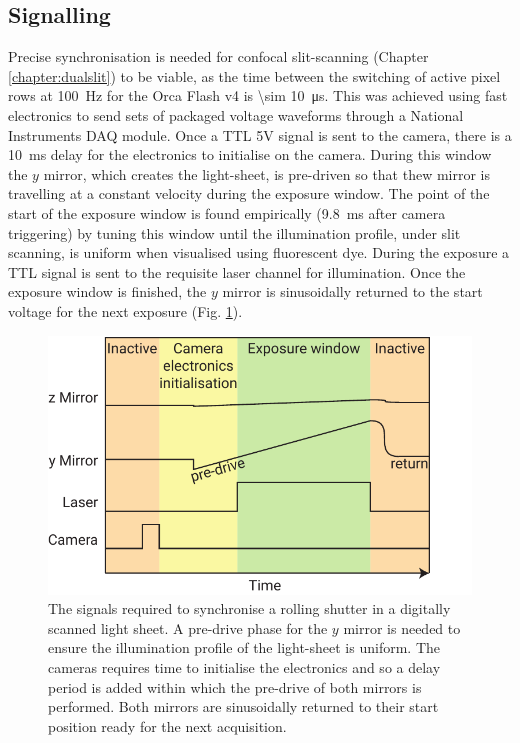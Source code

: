 

\subsection{Signalling} %

Precise synchronisation is needed for confocal slit-scanning (Chapter \ref{chapter:dualslit}) to be viable, as the time between the switching of active pixel rows at \SI{100}{\hertz} for the Orca Flash v4 is \SI{\sim 10}{\micro\second}. %
This was achieved using fast electronics to send sets of packaged voltage waveforms through a National Instruments DAQ module.
Once a TTL 5V signal is sent to the camera, there is a \SI{10}{\milli\second} delay for the electronics to initialise on the camera.
During this window the $y$ mirror, which creates the light-sheet, is pre-driven so that thew mirror is travelling at a constant velocity during the exposure window.
The point of the start of the exposure window is found empirically (\SI{9.8}{\milli\second} after camera triggering) by tuning this window until the illumination profile, under slit scanning, is uniform when visualised using fluorescent dye.
During the exposure a TTL signal is sent to the requisite laser channel for illumination.
Once the exposure window is finished, the $y$ mirror is sinusoidally returned to the start voltage for the next exposure (Fig. \ref{fig:slit_signals}).

\begin{figure}
  \centering
  \includegraphics{slit_signals}
  \caption{The signals required to synchronise a rolling shutter in a digitally scanned light sheet.
  A pre-drive phase for the $y$ mirror is needed to ensure the illumination profile of the light-sheet is uniform.
  The cameras requires time to initialise the electronics and so a delay period is added within which the pre-drive of both mirrors is performed.
  Both mirrors are sinusoidally returned to their start position ready for the next acquisition.
  }
  \label{fig:slit_signals}
\end{figure}

